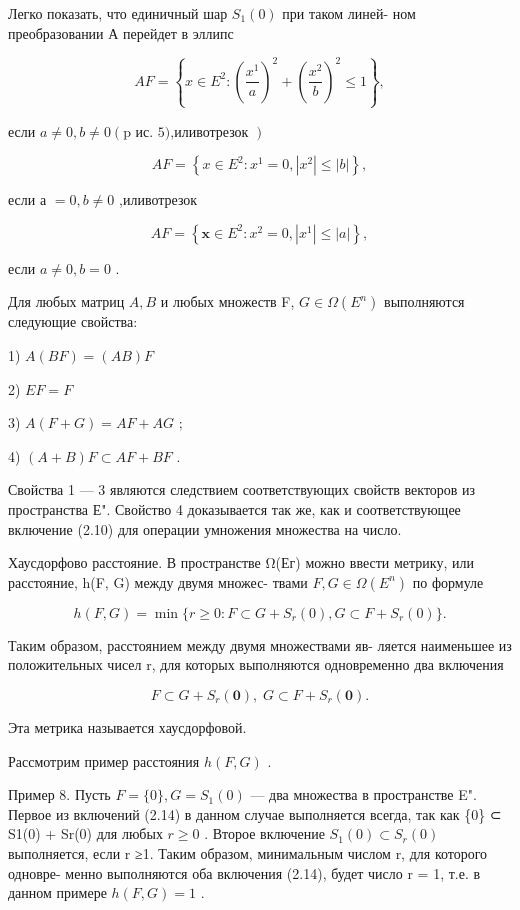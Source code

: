 \documentclass[8pt]{extarticle}
\begin{document}
Легко показать, что единичный шар \({S}_{1}\left( 0\right)\) при таком линей- ном преобразовании А перейдет в эллипс

\[
{AF} = \left\{  {x \in  {E}^{2} : {\left( \frac{{x}^{1}}{a}\right) }^{2} + {\left( \frac{{x}^{2}}{b}\right) }^{2} \leq  1}\right\}  ,
\]

если \(a \neq  0,b \neq  0\left( {\mathrm{p}\text{ ис. 5),иливотрезок }}\right)\)

\[
{AF} = \left\{  {x \in  {E}^{2} : {x}^{1} = 0,\left| {x}^{2}\right|  \leq  \left| b\right| }\right\}  ,
\]

если а \(= 0,b \neq  0\) ,иливотрезок

\[
{AF} = \left\{  {\mathbf{x} \in  {E}^{2} : {x}^{2} = 0,\left| {x}^{1}\right|  \leq  \left| a\right| }\right\}  ,
\]

если \(a \neq  0,b = 0\) .

Для любых матриц \(A,B\) и любых множеств F, \(G \in  \Omega \left( {E}^{n}\right)\) выполняются следующие свойства:

1) \(A\left( {BF}\right)  = \left( {AB}\right) F\)

2) \({EF} = F\)

3) \(A\left( {F + G}\right)  = {AF} + {AG}\) ;

4) \(\left( {A + B}\right) F \subset  {AF} + {BF}\) .

Свойства 1 — 3 являются следствием соответствующих свойств векторов из пространства Е". Свойство 4 доказывается так же, как и соответствующее включение (2.10) для операции умножения множества на число.

Хаусдорфово расстояние. В пространстве Ω(Ег) можно ввести метрику, или расстояние, h(F, G) между двумя множес- твами \(F,G \in  \Omega \left( {E}^{n}\right)\) по формуле

\[
h\left( {F,G}\right)  = \min \{ r \geq  0 : F \subset  G + {S}_{r}\left( 0\right) ,G \subset  F + {S}_{r}\left( 0\right) \} . \tag{2.13}
\]

Таким образом, расстоянием между двумя множествами яв- ляется наименьшее из положительных чисел r, для которых выполняются одновременно два включения

\[
F \subset  G + {S}_{r}\left( \mathbf{0}\right) ,\;G \subset  F + {S}_{r}\left( \mathbf{0}\right) . \tag{2.14}
\]

Эта метрика называется хаусдорфовой.

Рассмотрим пример расстояния \(h\left( {F,G}\right)\) .

Пример 8. Пусть \(F = \{ 0\} ,G = {S}_{1}\left( 0\right)\) — два множества в пространстве E". Первое из включений (2.14) в данном случае выполняется всегда, так как \{0\} ⊂ S1(0) + Sr(0) для любых \(r \geq  0\) . Второе включение \({S}_{1}\left( 0\right)  \subset  {S}_{r}\left( 0\right)\) выполняется, если r ≥1. Таким образом, минимальным числом r, для которого одновре- менно выполняются оба включения (2.14), будет число r = 1, т.е. в данном примере \(h\left( {F,G}\right)  = 1\) .
\end{document}
